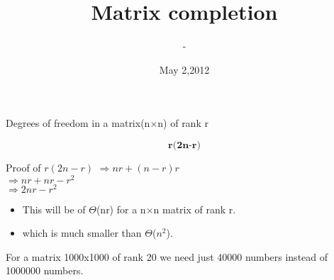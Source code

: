 \documentclass{beamer}
\title[Guessing missing enteries in a matrix]{Matrix completion}
\author{-}
\institute{IISc}
\date{May 2,2012}
\begin{document}
	
\begin{frame}
	\titlepage
\end{frame}


\begin{frame}{Degrees of freedom in a matrix(n$\times$n) of rank r}

	$$ \textbf{r(2n-r)} $$
	\vspace {-5mm}
	\begin{block}{Proof of ${r(2n-r)}$}
		$\Rightarrow nr +  (n-r)r$ \\
		$\Rightarrow nr + nr - r^2$  \\
		$\Rightarrow 2nr - r^2$  \\
	\end{block}
	
	\begin{itemize}
	  \item This will be of $\Theta$(nr) for a n$\times$n matrix of rank r.
	  \item which is much smaller than $\Theta$($n^2$).
	\end{itemize}
	\vspace{3mm}
	\begin{example}
	  For a matrix 1000x1000 of rank 20 we need just 40000 numbers instead of 1000000 numbers.
	\end{example}	
\end{frame}
\end{document}
